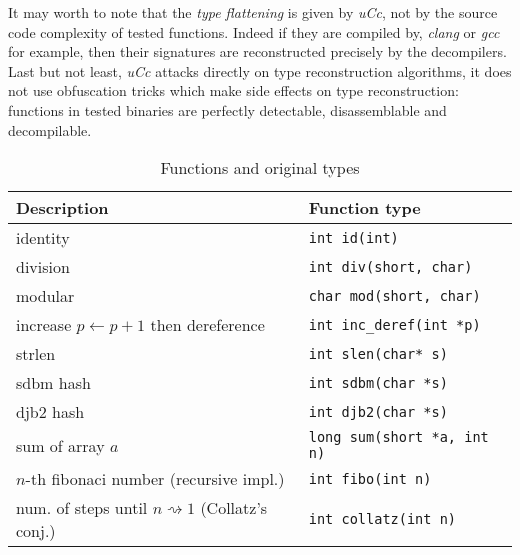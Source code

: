 \documentclass[a4paper]{llncs}
\begin{document}
It may worth to note that the \emph{type flattening} is given by \emph{uCc}, not by the source code
complexity of tested functions. Indeed if they are compiled by, \emph{clang} or \emph{gcc} for example,
then their signatures are reconstructed precisely
by the decompilers. Last but not least, \emph{uCc} attacks directly on type reconstruction algorithms,
it does not use obfuscation tricks
which make side effects on type
reconstruction: functions in tested binaries are perfectly detectable, disassemblable and
decompilable.

\begin{table}
	\begin{center}
		\caption{Functions and original types}\label{description}
		\begin{tabular}{|l|l|}
			\hline
			Description & Function type \\
			\hline
			identity & \texttt{int id(int)} \\
			\hline
			division & \texttt{int div(short, char)} \\
			\hline
			modular & \texttt{char mod(short, char)} \\
			\hline
			increase $p \leftarrow p + 1$ then dereference & \texttt{int inc\_deref(int *p)} \\
			\hline
			strlen  & \texttt{int slen(char* s)} \\
			\hline
			sdbm hash & \texttt{int sdbm(char *s)} \\
			\hline
			djb2 hash & \texttt{int djb2(char *s)} \\
			\hline
			sum of array $a$ & \texttt{long sum(short *a, int n)} \\
			\hline
			$n$-th fibonaci number (recursive impl.) & \texttt{int fibo(int n)} \\
			\hline
			num. of steps until $n \rightsquigarrow 1$ (Collatz's conj.)  & \texttt{int collatz(int n)} \\
			\hline
		\end{tabular}
	\end{center}
\end{table}
\end{document}
